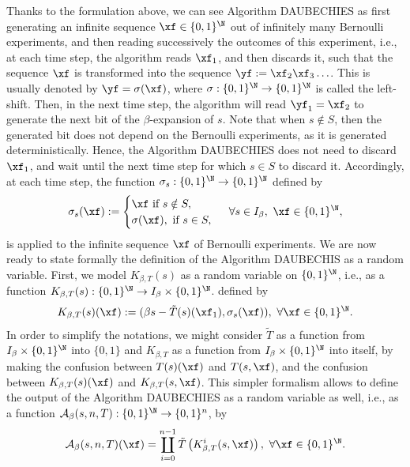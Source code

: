 Thanks to the formulation above, we can see Algorithm DAUBECHIES as first generating an infinite sequence $\xf \in \{0,1\}^\N$ out of infinitely many Bernoulli experiments, and then reading successively the outcomes of this experiment, i.e., at each time step, the algorithm reads $\xf_1$, and then discards it, such that the sequence $\xf$ is transformed into the sequence $\yf := \xf_2\xf_3\ldots$. This is usually denoted by $\yf = \sigma(\xf)$, where $\sigma : \{0,1\}^\N \to \{0,1\}^\N$ is called the left-shift. Then, in the next time step, the algorithm will read $\yf_1 = \xf_2$ to generate the next bit of the $\beta$-expansion of $s$.  Note that when $s \notin S$, then the generated bit does not depend on the Bernoulli experiments, as it is generated deterministically. Hence, the Algorithm DAUBECHIES does not need to discard $\xf_1$, and wait until the next time step for which $s \in S$ to discard it. Accordingly, at each time step, the function $\sigma_s : \{0,1\}^\N \to \{0,1\}^\N$ defined by 
\begin{equation}
    \sigma_s(\xf) := \begin{cases}
        \xf \ \text{if} \ s \notin S,\\
        \sigma(\xf), \ \text{if} \ s \in S,
    \end{cases} \ \forall s \in I_\beta, \ \xf \in \{0,1\}^\N,
\end{equation}
is applied to the infinite sequence $\xf$ of Bernoulli experiments. We are now ready to state formally the definition of the Algorithm DAUBECHIS as a random variable. First, we model $K_{\beta,T}(s)$ as a random variable on $\{0,1\}^\N$, i.e., as a function $K_{\beta,T}(s) : \{0,1\}^\N \to I_\beta \times \{0,1\}^\N$.  defined by 
\begin{equation}
    K_{\beta,T}(s)(\xf) := (\beta s - \tilde T(s)(\xf_1), \sigma_s(\xf)),
    \ \forall \xf \in \{0,1\}^\N.
\end{equation}
In order to simplify the notations, we might consider $\tilde T$ as a function from $I_\beta \times \{0,1\}^\N$ into $\{0,1\}$ and $K_{\beta,T}$ as a function from $I_\beta \times \{0,1\}^\N$ into itself, by making the confusion between $T(s)(\xf)$ and $T(s,\xf)$, and the confusion between $K_{\beta,T}(s)(\xf)$ and $K_{\beta,T}(s,\xf)$. This simpler formalism allows to define the output of the Algorithm DAUBECHIES as a random variable as well, i.e., as a function $\mathcal A_\beta(s,n,T) : \{0,1\}^\N \to \{0,1\}^n$, by 
\begin{equation}
    \mathcal A_\beta(s,n,T)(\xf) = \coprod_{i=0}^{n-1} \tilde T\left(K_{\beta,T}^i(s,\xf)\right), \ \forall \xf \in \{0,1\}^\N.
\end{equation}
